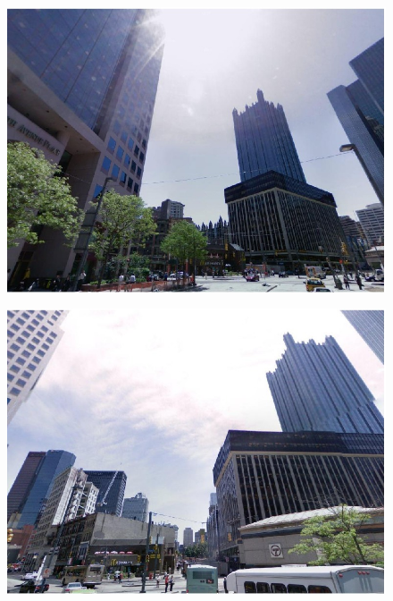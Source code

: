 \begin{figure}[!ht]
{\begin{minipage}{\subw}
{		  \includegraphics[width=1.05\linewidth]{imgs/demo03.jpg}
		  }
		\end{minipage}
	 }
	 \colorbox{myRed}{
		\begin{minipage}{\subw}
		  \centerline{
		  \includegraphics[width=1.05\linewidth]{imgs/demo04.jpg}
		  }
		\end{minipage}
	 }
	 \vspace{1mm}
	 \\
	 \colorbox{gray}{
		\begin{minipage}{\subw}
		  \centerline{
}
\end{minipage}}
\end{figure}
